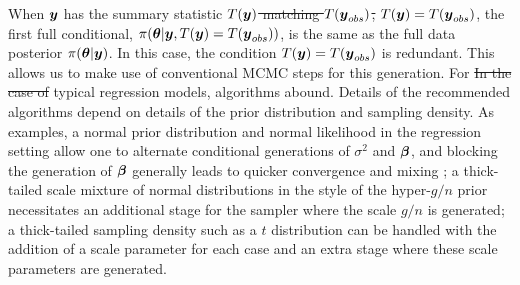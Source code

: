 \documentclass[12pt]{article}
\def\bth{\mbox{\boldmath $\theta$}}
\def\bbeta{\mbox{\boldmath $\beta$}}
\newcommand{\by}{\mbox{\boldmath $y$}}
\newcommand{\red}[1]{{\color{red}#1}}
\newcommand{\green}[1]{{\color{green}#1}}
\begin{document}
When $\by$ has the summary statistic \sout{$T(\by)$ matching $T(\by_{obs})$,} \green{$T(\by) = T(\by_{obs})$,}
the first full conditional, $\pi(\bth|\by, T(\by)=T(\by_{obs}))$, is
\red{the same as} the full data posterior
$\pi(\bth|\by)$. 
\green{In this case, the condition $T(\by) = T(\by_{obs})$ is redundant.  This allows us to make use of conventional MCMC steps for this generation.  For} 
\sout{In the case of} typical regression models, algorithms abound.  Details of the \green{recommended} algorithms depend on details of
the prior distribution and sampling density.  As examples, a normal
prior distribution and normal likelihood in the regression setting
allow one to alternate conditional generations of $\sigma^2$ and $\bbeta$, and blocking the generation of $\bbeta$ generally
leads to quicker convergence and mixing \citep{liu1994}; a thick-tailed scale mixture of normal distributions
in the style of the 
hyper-$g/n$ prior \citep{liang2008} necessitates an additional stage for the sampler where the scale 
$g/n$ is generated; a thick-tailed sampling density such as a $t$ distribution can be handled with the addition of 
a scale parameter for each case and an extra stage where these scale parameters are generated.  
\end{document}
